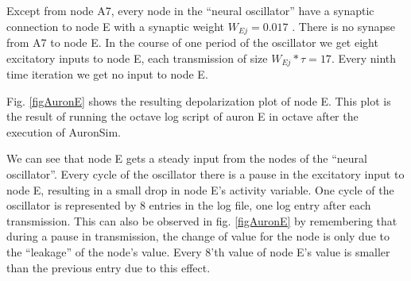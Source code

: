 	Except from node A7, every node in the ``neural oscillator'' have a synaptic connection to node E with a synaptic weight $W_{Ej}=0.017$ . %
	There is no synapse from A7 to node E.
	In the course of one period of the oscillator we get eight excitatory inputs to node E, each transmission of size $W_{Ej}*\tau = 17$. 
	Every ninth time iteration we get no input to node E.

	Fig. \ref{figAuronE} shows the resulting depolarization plot of node E. 
	This plot is the result of running the octave log script of auron E in octave after the execution of AuronSim.

	We can see that node E gets a steady input from the nodes of the ``neural oscillator''.
	Every cycle of the oscillator there is a pause in the excitatory input to node E, resulting in a small drop in node E's activity variable. 
	One cycle of the oscillator is represented by 8 entries in the log file, one log entry after each transmission.
	This can also be observed in fig. \ref{figAuronE} by remembering that during a pause in transmission, the change of value for the node is only due to the ``leakage'' of the node's value.
	Every 8'th value of node E's value is smaller than the previous entry due to this effect.



